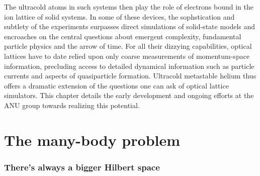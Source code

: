 	The ultracold atoms in such systems then play the role of electrons bound in the ion lattice of solid systems.
	In some of these devices, the sophstication and subtlety of the experiments surpasses direct simulations of solid-state models and encroaches on the central questions about emergent complexity, fundamental particle physics and the arrow of time.
	For all their dizzying capabilities, optical lattices have to date relied upon only coarse measurements of momentum-space information, precluding access to detailed dynamical information such as particle currents and aspects of quasiparticle formation.
	Ultracold metastable helium thus offers a dramatic extension of the questions one can ask of optical lattice simulators.
	This chapter details the early development and ongoing efforts at the ANU \mhe group towards realizing this potential.


\begin{adjustwidth}{1.5cm}{0cm}
\end{adjustwidth}

\section{The many-body problem}
\subsubsection*{There's always a bigger Hilbert space}

